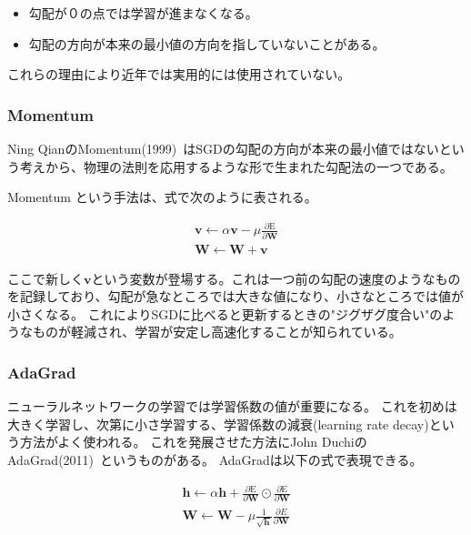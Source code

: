 \begin{itemize}
  \item 勾配が０の点では学習が進まなくなる。
  \item 勾配の方向が本来の最小値の方向を指していないことがある。
\end{itemize}
これらの理由により近年では実用的には使用されていない。

\subsubsection{Momentum}

Ning QianのMomentum(1999)~\cite{momentum}はSGDの勾配の方向が本来の最小値ではないという考えから、物理の法則を応用するような形で生まれた勾配法の一つである。


Momentum という手法は、式で次のように表される。

\begin{eqnarray}
    \mathbf{v} \leftarrow \alpha \mathbf{v} - \mu \frac {\partial \mathrm{E} }{\partial \mathbf{W}} \\
    \mathbf{W} \leftarrow \mathbf{W+v}
\label{eq:momentum}
\end{eqnarray}

ここで新しく$ \mathbf{v} $という変数が登場する。これは一つ前の勾配の速度のようなものを記録しており、勾配が急なところでは大きな値になり、小さなところでは値が小さくなる。
これによりSGDに比べると更新するときの"ジグザグ度合い"のようなものが軽減され、学習が安定し高速化することが知られている。


\subsubsection{AdaGrad}

ニューラルネットワークの学習では学習係数の値が重要になる。
これを初めは大きく学習し、次第に小さ学習する、学習係数の減衰(learning rate decay)という方法がよく使われる。
これを発展させた方法にJohn DuchiのAdaGrad(2011)~\cite{adagrad}というものがある。
AdaGradは以下の式で表現できる。

\begin{eqnarray}　
    \mathbf{h} \leftarrow \alpha \mathbf{h} + \frac {\partial \mathrm{E} }{\partial \mathbf{W}} \odot \frac {\partial \mathrm{E} }{\partial \mathbf{W}}  \\
    \mathbf{W} \leftarrow \mathbf{W}  - \mu \frac{ 1 }{\sqrt{\mathbf{h}}} \frac{ \partial E }{\partial \mathbf{W}} 
\label{eq:adagrad}
\end{eqnarray}

